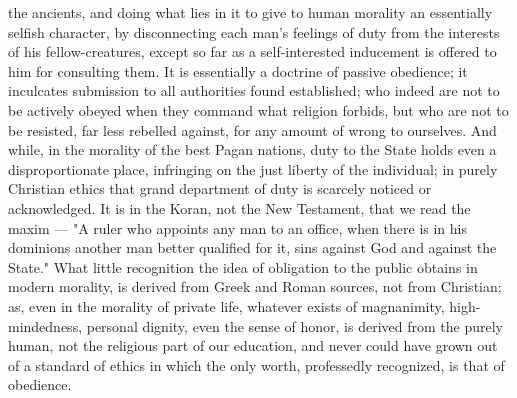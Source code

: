 \documentclass[12pt]{report}
\begin{document}
the ancients, and doing what lies in it to give to human morality an essentially selfish character, by disconnecting each man's feelings of duty from the interests of his fellow-creatures, except so far as a self-interested inducement is offered to him for consulting them. It is essentially a doctrine of passive obedience; it inculcates submission to all authorities found established; who indeed are not to be actively obeyed when they command what religion forbids, but who are not to be resisted, far less rebelled against, for any amount of wrong to ourselves. And while, in the morality of the best Pagan nations, duty to the State holds even a disproportionate place, infringing on the just liberty of the individual; in purely Christian ethics that grand department of duty is scarcely noticed or acknowledged. It is in the Koran, not the New Testament, that we read the maxim — "A ruler who appoints any man to an office, when there is in his dominions another man better qualified for it, sins against God and against the State." What little recognition the idea of obligation to the public obtains in modern morality, is derived from Greek and Roman sources, not from Christian; as, even in the morality of private life, whatever exists of magnanimity, high-mindedness, personal dignity, even the sense of honor, is derived from the purely human, not the religious part of our education, and never could have grown out of a standard of ethics in which the only worth, professedly recognized, is that of obedience.
\end{document}
